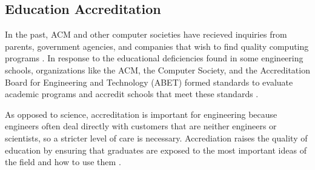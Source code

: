 \subsection{Education Accreditation}

In the past, ACM and other computer societies have recieved inquiries from
parents, government agencies, and companies that wish to find quality computing
programs \cite{Mulder84}. In response to the educational deficiencies found in
some engineering schools, organizations like the ACM, the Computer Society, and
the Accreditation Board for Engineering and Technology (ABET) formed standards
to evaluate academic programs and accredit schools that meet these standards
\cite{ABET,Mulder84}.

As opposed to science, accreditation is important for engineering because
engineers often deal directly with customers that are neither engineers or
scientists, so a stricter level of care is necessary. Accrediation raises the
quality of education by ensuring that graduates are exposed to the most
important ideas of the field and how to use them \cite{Parnas98}.


